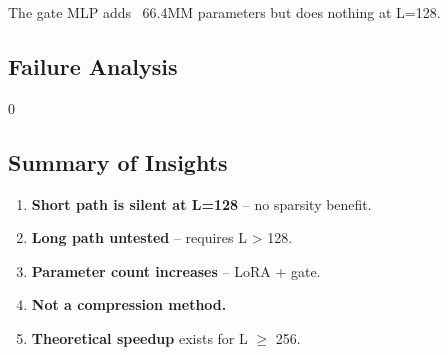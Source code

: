 The gate MLP adds ~66.4MM parameters but does nothing at L=128.

\subsection{Failure Analysis}

0

\subsection{Summary of Insights}

\begin{enumerate}
\item \textbf{Short path is silent at L=128} -- no sparsity benefit.
\item \textbf{Long path untested} -- requires L \textgreater{} 128.
\item \textbf{Parameter count increases} -- LoRA + gate.
\item \textbf{Not a compression method.}
\item \textbf{Theoretical speedup} exists for L $\ge$ 256.

\end{enumerate}
